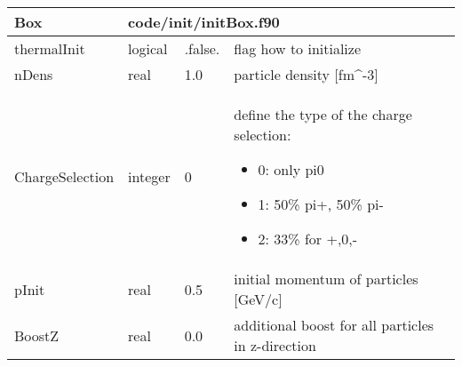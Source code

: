 \documentclass{article}
\begin{document}

\begin{longtable}{llll}
\toprule
\textbf{\large{Box}} & \multicolumn{3}{l}{\footnotesize{code/init/initBox.f90}}\\*
\midrule
\endfirsthead
\midrule
\endhead
thermalInit & \begin{minipage}[t]{2cm}logical\end{minipage} & \begin{minipage}[t]{2cm}.false.\end{minipage} & \begin{minipage}[t]{12cm}flag how to initialize\end{minipage}\\*
\midrule
nDens & \begin{minipage}[t]{2cm}real\end{minipage} & \begin{minipage}[t]{2cm}1.0\end{minipage} & \begin{minipage}[t]{12cm}particle density [fm\^{}-3]\end{minipage}\\*
\midrule
ChargeSelection & \begin{minipage}[t]{2cm}integer\end{minipage} & \begin{minipage}[t]{2cm}0\end{minipage} & \begin{minipage}[t]{12cm}define the type of the charge selection:\begin{itemize}\leftmargin0em\itemindent0pt\item 0: only pi0\item 1: 50\% pi+, 50\% pi-\item 2: 33\% for +,0,-\end{itemize}\end{minipage}\\*
\midrule
pInit & \begin{minipage}[t]{2cm}real\end{minipage} & \begin{minipage}[t]{2cm}0.5\end{minipage} & \begin{minipage}[t]{12cm}initial momentum of particles [GeV/c]\end{minipage}\\*
\midrule
BoostZ & \begin{minipage}[t]{2cm}real\end{minipage} & \begin{minipage}[t]{2cm}0.0\end{minipage} & \begin{minipage}[t]{12cm}additional boost for all particles in z-direction\end{minipage}\\*

\end{longtable}
\end{document}
